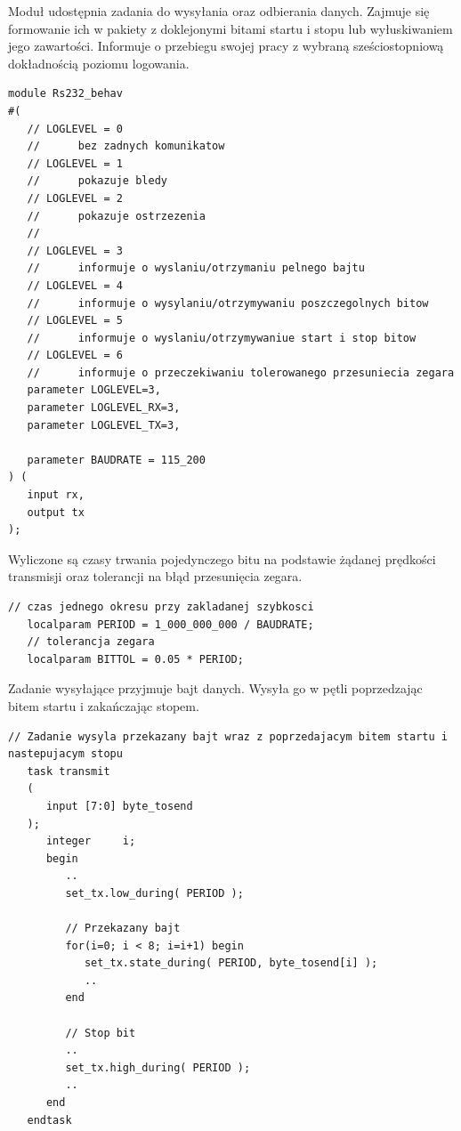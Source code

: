 \documentclass[a4paper,12pt]{article}
\begin{document}
Moduł udostępnia zadania do wysyłania oraz odbierania danych. Zajmuje się formowanie ich w pakiety z doklejonymi bitami startu i stopu lub wyłuskiwaniem jego zawartości. Informuje o przebiegu swojej pracy z wybraną sześciostopniową dokładnością poziomu logowania.
\begin{lstlisting}[label=sim/Rs232 behav,caption=sim/Rs232 behav.v]
module Rs232_behav
#(
   // LOGLEVEL = 0
   //      bez zadnych komunikatow
   // LOGLEVEL = 1
   //      pokazuje bledy
   // LOGLEVEL = 2
   //      pokazuje ostrzezenia
   //
   // LOGLEVEL = 3
   //      informuje o wyslaniu/otrzymaniu pelnego bajtu
   // LOGLEVEL = 4
   //      informuje o wysylaniu/otrzymywaniu poszczegolnych bitow
   // LOGLEVEL = 5
   //      informuje o wyslaniu/otrzymywaniue start i stop bitow
   // LOGLEVEL = 6
   //      informuje o przeczekiwaniu tolerowanego przesuniecia zegara
   parameter LOGLEVEL=3,
   parameter LOGLEVEL_RX=3,
   parameter LOGLEVEL_TX=3,

   parameter BAUDRATE = 115_200
) (
   input rx,
   output tx
);
\end{lstlisting}

Wyliczone są czasy trwania pojedynczego bitu na podstawie żądanej prędkości transmisji oraz tolerancji na błąd przesunięcia zegara.
\begin{lstlisting}[label=sim/Rs232 behav,caption=sim/Rs232 behav.v,firstnumber=64]
   // czas jednego okresu przy zakladanej szybkosci
   localparam PERIOD = 1_000_000_000 / BAUDRATE;
   // tolerancja zegara
   localparam BITTOL = 0.05 * PERIOD;
\end{lstlisting}

Zadanie wysyłające przyjmuje bajt danych. Wysyła go w pętli poprzedzając bitem startu i zakańczając stopem.
\begin{lstlisting}[label=sim/Rs232 behav,caption=sim/Rs232 behav.v,firstnumber=64]
   // Zadanie wysyla przekazany bajt wraz z poprzedajacym bitem startu i nastepujacym stopu
   task transmit
   (
      input [7:0] byte_tosend
   );
      integer     i;
      begin
         ..
         set_tx.low_during( PERIOD );

         // Przekazany bajt
         for(i=0; i < 8; i=i+1) begin
            set_tx.state_during( PERIOD, byte_tosend[i] );
            ..
         end

         // Stop bit
         ..
         set_tx.high_during( PERIOD );
         ..
      end
   endtask
\end{lstlisting}
\end{document}
